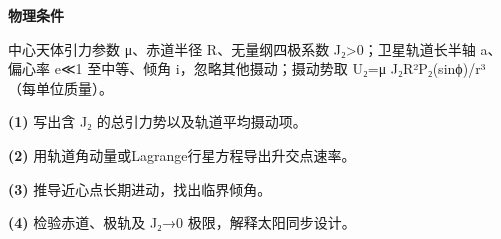 \textbf{物理条件}\par 中心天体引力参数 μ、赤道半径 R、无量纲四极系数 J₂>0；卫星轨道长半轴 a、偏心率 e≪1 至中等、倾角 i，忽略其他摄动；摄动势取 U₂=μ J₂R²P₂(sinϕ)/r³（每单位质量）。
\par\noindent\textbf{(1)} 写出含 J₂ 的总引力势以及轨道平均摄动项。
\par\noindent\textbf{(2)} 用轨道角动量或Lagrange行星方程导出升交点速率。
\par\noindent\textbf{(3)} 推导近心点长期进动，找出临界倾角。
\par\noindent\textbf{(4)} 检验赤道、极轨及 J₂→0 极限，解释太阳同步设计。
